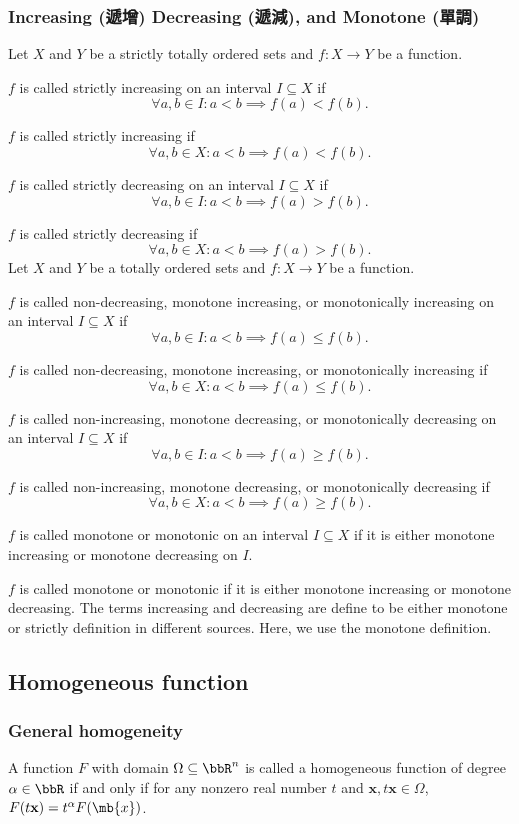 \documentclass[a4paper,12pt]{report}
\begin{document}
\subsubsection{Increasing (遞增) Decreasing (遞減), and Monotone (單調)}
Let $X$ and $Y$ be a strictly totally ordered sets and $f\colon X\to Y$ be a function.
\bit
\item $f$ is called strictly increasing on an interval $I\subseteq X$ if
\[\forall a,b\in I\colon a<b\implies f(a)<f(b).\]
\item $f$ is called strictly increasing if
\[\forall a,b\in X\colon a<b\implies f(a)<f(b).\]
\item $f$ is called strictly decreasing on an interval $I\subseteq X$ if
\[\forall a,b\in I\colon a<b\implies f(a)>f(b).\]
\item $f$ is called strictly decreasing if
\[\forall a,b\in X\colon a<b\implies f(a)>f(b).\]
\eit
Let $X$ and $Y$ be a totally ordered sets and $f\colon X\to Y$ be a function.
\bit
\item $f$ is called non-decreasing, monotone increasing, or monotonically increasing on an interval $I\subseteq X$ if
\[\forall a,b\in I\colon a<b\implies f(a)\leq f(b).\]
\item $f$ is called non-decreasing, monotone increasing, or monotonically increasing if
\[\forall a,b\in X\colon a<b\implies f(a)\leq f(b).\]
\item $f$ is called non-increasing, monotone decreasing, or monotonically decreasing on an interval $I\subseteq X$ if
\[\forall a,b\in I\colon a<b\implies f(a)\geq f(b).\]
\item $f$ is called non-increasing, monotone decreasing, or monotonically decreasing if
\[\forall a,b\in X\colon a<b\implies f(a)\geq f(b).\]
\item $f$ is called monotone or monotonic on an interval $I\subseteq X$ if it is either monotone increasing or monotone decreasing on $I$.
\item $f$ is called monotone or monotonic if it is either monotone increasing or monotone decreasing.
\eit
The terms increasing and decreasing are define to be either monotone or strictly definition in different sources. Here, we use the monotone definition.
\subsection{Homogeneous function}
\subsubsection{General homogeneity}
A function $F$ with domain $\Omega\subseteq\bbR^n$ is called a homogeneous function of degree $\alpha\in\bbR$ if and only if for any nonzero real number $t$ and $\mathbf{x},t\mathbf{x}\in\Omega$, $F(t\mathbf{x})=t^{\alpha}F(\mb{x})$.
\end{document}
